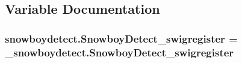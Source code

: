 \subsection{Variable Documentation}
\subsubsection[{\texorpdfstring{Snowboy\+Detect\+\_\+swigregister}{SnowboyDetect_swigregister}}]{\setlength{\rightskip}{0pt plus 5cm}snowboydetect.\+Snowboy\+Detect\+\_\+swigregister = \+\_\+snowboydetect.\+Snowboy\+Detect\+\_\+swigregister}\hypertarget{namespacesnowboydetect_ad3f82c4df0dafced328be1f6f11e18c8}{}\label{namespacesnowboydetect_ad3f82c4df0dafced328be1f6f11e18c8}
